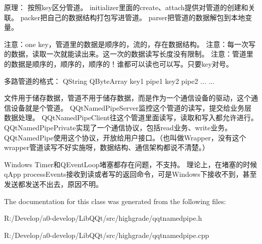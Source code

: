 原理： 按照key区分管道。 initializer里面的create、attach提供对管道的创建和关联。 packer把自己的数据结构打包写进管道。 parser把管道的数据解包到本地变量。

注意：one key，管道里的数据是顺序的，流的，存在数据结构。 注意：每一次写的数据，读取一次就能读出来。这一次的数据读写长度没有限制。 注意：管道里的数据是顺序的，顺序的，顺序的！谁都可以读也可以写。只要key对号。

多路管道的格式： Q\+String Q\+Byte\+Array key1 pipe1 key2 pipe2 ... ...

文件用于储存数据，管道不用于储存数据，而是作为一个通信设备的驱动，这个通信设备就是个管道。 Q\+Qt\+Named\+Pipe\+Server监控这个管道的读写，提交给业务层数据处理。 Q\+Qt\+Named\+Pipe\+Client往这个管道里面读写，读取和写入都允许进行。 Q\+Qt\+Named\+Pipe\+Private实现了一个通信协议，包括read业务、write业务。 Q\+Qt\+Named\+Pipe使用这个协议，开放给用户接口。（也叫做\+Wrapper，没有这个wrapper管道读写不好实施呀，数据结构、通信架构都说不清楚。）

Windows Timer和\+Q\+Event\+Loop堵塞都存在问题，不支持。 理论上，在堵塞的时候q\+App process\+Events接收到读或者写的返回命令，可是\+Windows下接收不到，甚至发送都发送不出去，原因不明。 

The documentation for this class was generated from the following files\+:\begin{DoxyCompactItemize}
\item 
R\+:/\+Develop/a0-\/develop/\+Lib\+Q\+Qt/src/highgrade/qqtnamedpipe.\+h\item 
R\+:/\+Develop/a0-\/develop/\+Lib\+Q\+Qt/src/highgrade/qqtnamedpipe.\+cpp\end{DoxyCompactItemize}
